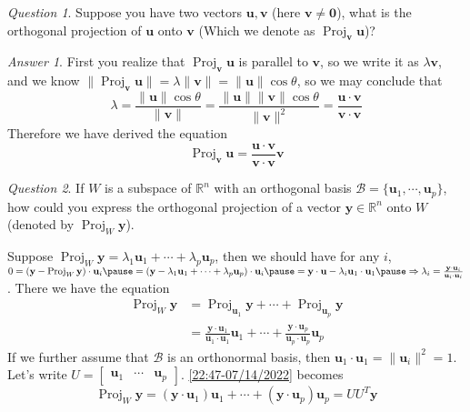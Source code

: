 \documentclass{beamer}
\DeclareMathOperator{\Proj}{Proj}
\theoremstyle{definition}
\theoremstyle{remark}
\newtheorem*{question}{Question}
\newtheorem*{answer}{Answer}
\begin{document}
\begin{frame}[t]
\begin{question}
Suppose you have two vectors $\mathbf u,\mathbf v$ (here $\mathbf v\neq\mathbf0$), what is the orthogonal projection of $\mathbf u$ onto $\mathbf v$ (Which we denote as $\Proj_{\mathbf v}\mathbf u$)?
\end{question}
\pause
\begin{answer}
First you realize that $\Proj_{\mathbf v}\mathbf u$ is parallel to $\mathbf v$, so we write it as $\lambda\mathbf v$\pause, and we know $\|\Proj_{\mathbf v}\mathbf u\|=\lambda\|\mathbf v\|=\|\mathbf u\|\cos\theta$, so we may conclude that\pause\pause
\[
\lambda=\frac{\|\mathbf u\|\cos\theta}{\|\mathbf v\|}=\frac{\|\mathbf u\|\|\mathbf v\|\cos\theta}{\|\mathbf v\|^2}=\frac{\mathbf u\cdot\mathbf v}{\mathbf v\cdot\mathbf v}
\]\pause
Therefore we have derived the equation
\begin{equation}\label{13:10-07/14/2022}
\Proj_{\mathbf v}\mathbf u=\frac{\mathbf u\cdot\mathbf v}{\mathbf v\cdot\mathbf v}\mathbf v
\end{equation}
\end{answer}
\end{frame}

\begin{frame}[t]
\begin{question}
If $W$ is a subspace of $\mathbb R^n$ with an orthogonal basis $\mathcal B=\{\mathbf u_1,\cdots,\mathbf u_p\}$, how could you express the orthogonal projection of a vector $\mathbf y\in\mathbb R^n$ onto $W$ (denoted by $\Proj_W\mathbf y$).
\end{question}
\pause
Suppose $\Proj_W\mathbf y=\lambda_1\mathbf u_1+\cdots+\lambda_p\mathbf u_p$\pause, then we should have for any $i$, $0=(\mathbf y-\Proj_W\mathbf y)\cdot\mathbf u_i\pause=(\mathbf y-\lambda_1\mathbf u_1+\cdots+\lambda_p\mathbf u_p)\cdot\mathbf u_i\pause=\mathbf y\cdot\mathbf u-\lambda_i\mathbf u_1\cdot\mathbf u_1\pause\Rightarrow\lambda_i=\frac{\mathbf y\cdot\mathbf u_i}{\mathbf u_i\cdot\mathbf u_i}$\pause. There we have the equation
\begin{equation}\label{22:47-07/14/2022}
\begin{aligned}
\Proj_W\mathbf y&=\Proj_{\mathbf u_1}\mathbf y+\cdots+\Proj_{\mathbf u_p}\mathbf y\\
&=\frac{\mathbf y\cdot\mathbf u_1}{\mathbf u_1\cdot\mathbf u_1}\mathbf u_1+\cdots+\frac{\mathbf y\cdot\mathbf u_p}{\mathbf u_p\cdot\mathbf u_p}\mathbf u_p
\end{aligned}
\end{equation}
\pause
If we further assume that $\mathcal B$ is an orthonormal basis, then $\mathbf u_1\cdot\mathbf u_1=\|\mathbf u_i\|^2=1$. Let's write $U=\begin{bmatrix}
\mathbf u_1&\cdots&\mathbf u_p
\end{bmatrix}$. \eqref{22:47-07/14/2022} becomes\pause
\begin{equation}\label{22:51-07/14/2022}
\Proj_W\mathbf y=(\mathbf y\cdot\mathbf u_1)\mathbf u_1+\cdots+(\mathbf y\cdot\mathbf u_p)\mathbf u_p=UU^T\mathbf y
\end{equation}
\end{frame}
\end{document}

